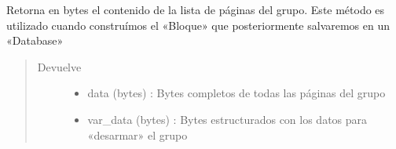 \documentclass[a4paper,12pt,spanish]{sphinxmanual}
\begin{document}
\begin{fulllineitems}
\begin{fulllineitems}
\begin{sphinxVerbatim}[commandchars=\\\{\}]
   
  
  
\end{sphinxVerbatim}

\end{fulllineitems}


\begin{fulllineitems}
\label{\detokenize{openerm.PageContainer:openerm.PageContainer.PageContainer.dump}}
Retorna en bytes el contenido de la lista de páginas del grupo. Este método
es utilizado cuando construímos el «Bloque» que posteriormente salvaremos en
un «Database»
\begin{quote}\begin{description}
\item[{Devuelve}] \leavevmode
\begin{itemize}
\item {} 
data (bytes)          : Bytes completos de todas las páginas del grupo

\item {} 
var\_data (bytes)      : Bytes estructurados con los datos para «desarmar» el grupo


\end{itemize}
\end{description}
\end{quote}
\end{fulllineitems}
\end{fulllineitems}
\end{document}
